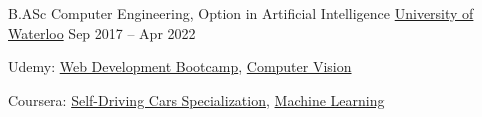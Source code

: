 \documentclass[]{awesome-cv}
\begin{document}
\begin{cventries}
	\cventry
	{B.ASc Computer Engineering, Option in Artificial Intelligence}
	{\href{https://uwaterloo.ca/future-students/programs/computer-engineering}{University of Waterloo}}
	{}
	{Sep 2017 – Apr 2022}
	{\begin{cvitems}
		\item {Udemy: \href{https://www.udemy.com/certificate/UC-28be8e98-f2a4-4989-b09c-df1ee4a4cc03/}
		{Web Development Bootcamp}, 
		\href{https://www.udemy.com/certificate/UC-TJRJ90AG/}{Computer Vision}}
		\item {Coursera: \href{https://www.coursera.org/account/accomplishments/specialization/BA8UYMH6SUSL}{Self-Driving Cars Specialization}, 
		\href{https://www.coursera.org/account/accomplishments/verify/AELG6KXXJ88V}{Machine Learning}}
	\end{cvitems}}
\end{cventries}
\end{document}
